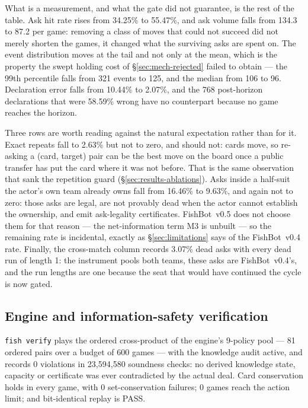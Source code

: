 \documentclass[11pt]{article}
\theoremstyle{definition}
\DeclareRobustCommand{\vfive}{\texorpdfstring{\mbox{FishBot v0.5}}{FishBot v0.5}}
\DeclareRobustCommand{\vfour}{\texorpdfstring{\mbox{FishBot v0.4}}{FishBot v0.4}}
\providecommand{\numVerifyViolations}{0}
\providecommand{\numVerifyChecks}{23{,}594{,}580}
\providecommand{\numFourDeclWrong}{10.44}
\providecommand{\numFourPostHorizonDecl}{768}
\providecommand{\numFiveRepeatAsk}{2.63}
\providecommand{\numFiveDeclWrong}{2.07}
\providecommand{\numVerifyDeterminism}{PASS}
\providecommand{\numVerifyLimitGames}{0}
\providecommand{\numVerifySetFail}{0}
\providecommand{\numVerifyGames}{600}
\providecommand{\numCrossDeadAsk}{3.07}
\providecommand{\numCrossDeadRunLongest}{1}
\providecommand{\numFiveAsks}{87.2}
\providecommand{\numFiveEventsMedian}{96}
\providecommand{\numFiveEventsPninetynine}{125}
\providecommand{\numFiveHit}{55.47}
\providecommand{\numFiveOwnLocked}{9.63}
\providecommand{\numFourAsks}{134.3}
\providecommand{\numFourEventsMedian}{106}
\providecommand{\numFourEventsPninetynine}{321}
\providecommand{\numFourHit}{34.25}
\providecommand{\numFourOwnLocked}{16.46}
\providecommand{\numFourPostHorizonWrong}{58.59}
\providecommand{\numVerifyPool}{9}
\providecommand{\numVerifyPairs}{81}
\begin{document}
What is a measurement, and what the gate did not guarantee, is the rest of the
table. Ask hit rate rises from \numFourHit\% to \numFiveHit\%, and ask volume
falls from \numFourAsks{} to \numFiveAsks{} per game: removing a class of moves
that could not succeed did not merely shorten the games, it changed what the
surviving asks are spent on. The event distribution moves at the tail and not
only at the mean, which is the property the swept holding cost of
\S\ref{sec:mech-rejected} failed to obtain --- the 99th percentile falls from
\numFourEventsPninetynine{} events to \numFiveEventsPninetynine{}, and the median
from \numFourEventsMedian{} to \numFiveEventsMedian{}. Declaration error falls
from \numFourDeclWrong\% to \numFiveDeclWrong\%, and the \numFourPostHorizonDecl{}
post-horizon declarations that were \numFourPostHorizonWrong\% wrong have no
counterpart because no game reaches the horizon.

Three rows are worth reading against the natural expectation rather than for it.
Exact repeats fall to \numFiveRepeatAsk\% but not to zero, and should not: cards
move, so re-asking a (card, target) pair can be the best move on the board once a
public transfer has put the card where it was not before. That is the same
observation that sank the repetition guard (\S\ref{sec:results-ablations}). Asks
inside a half-suit the actor's own team already owns fall from \numFourOwnLocked\%
to \numFiveOwnLocked\%, and again not to zero: those asks are legal, are not
provably dead when the actor cannot establish the ownership, and emit ask-legality
certificates. \vfive{} does not choose them for that reason --- the net-information
term M3 is unbuilt --- so the remaining rate is incidental, exactly as
\S\ref{sec:limitations} says of the \vfour{} rate. Finally, the cross-match column
records \numCrossDeadAsk\% dead asks with every dead run of length
\numCrossDeadRunLongest{}: the instrument pools both teams, these asks are
\vfour{}'s, and the run lengths are one because the seat that would have continued
the cycle is now gated.

\subsection{Engine and information-safety verification}
\label{sec:results-verify}

\texttt{fish verify} plays the ordered cross-product of the engine's
\numVerifyPool{}-policy pool --- \numVerifyPairs{} ordered pairs over a budget of
\numVerifyGames{} games --- with the knowledge audit active, and records
\numVerifyViolations{} violations in \numVerifyChecks{} soundness checks: no
derived knowledge state, capacity or certificate was ever contradicted by the
actual deal. Card conservation holds in every game, with \numVerifySetFail{}
set-conservation failures; \numVerifyLimitGames{} games reach the action limit;
and bit-identical replay is \numVerifyDeterminism{}.
\end{document}
